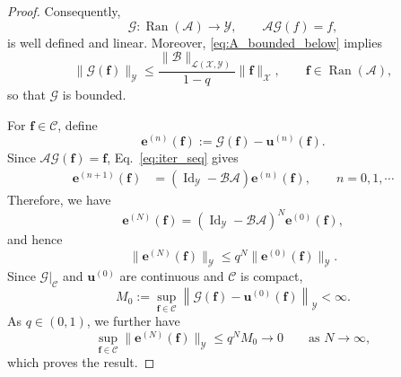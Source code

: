 \documentclass[preprint,numbers,sort&compress]{elsarticle}
\begin{document}
\begin{proof}
				Consequently,
				\[
				\mathcal G: \operatorname{Ran}(\mathcal A)\to\mathcal Y,
				\qquad
				\mathcal A\mathcal G(f)=f,
				\]
				is well defined and linear. Moreover, \eqref{eq:A_bounded_below} implies
				\[
				\|\mathcal G(\boldsymbol f)\|_{\mathcal Y}
				\leq
				\frac{\|\mathcal B\|_{\mathcal L(\mathcal X,\mathcal Y)}}{1-q}
				\|\boldsymbol f\|_{\mathcal X},
				\qquad
				\boldsymbol f\in\operatorname{Ran}(\mathcal A),
				\]
				so that $\mathcal G$ is bounded.
				
				For $\boldsymbol f\in\mathcal C$, define
				\[
				\boldsymbol e^{(n)}(\boldsymbol f)
				:=
				\mathcal G(\boldsymbol f)
				-
				\boldsymbol u^{(n)}(\boldsymbol f).
				\]
				Since
				$\mathcal A\mathcal G(\boldsymbol f)=\boldsymbol f$,
				Eq.~\eqref{eq:iter_seq} gives
				\[
				\begin{aligned}
					\boldsymbol e^{(n+1)}(\boldsymbol f)
					&=
					\left(
					\operatorname{Id}_{\mathcal Y}
					-
					\mathcal B\mathcal A
					\right)
					\boldsymbol e^{(n)}(\boldsymbol f), \qquad n=0, 1, \cdots
				\end{aligned}
				\]
				Therefore, we have
				\[
				\boldsymbol e^{(N)}(\boldsymbol f)
				=
				\left(
				\operatorname{Id}_{\mathcal Y}
				-
				\mathcal B\mathcal A
				\right)^N
				\boldsymbol e^{(0)}(\boldsymbol f),
				\]
				and hence
				\[
				\|\boldsymbol e^{(N)}(\boldsymbol f)\|_{\mathcal Y}
				\leq
				q^N
				\|\boldsymbol e^{(0)}(\boldsymbol f)\|_{\mathcal Y}.
				\]
				Since $\mathcal G|_{\mathcal C}$ and $\boldsymbol u^{(0)}$ are continuous
				and $\mathcal C$ is compact,
				\[
				M_0
				:=
				\sup_{\boldsymbol f\in\mathcal C}
				\left\|
				\mathcal G(\boldsymbol f)
				-
				\boldsymbol u^{(0)}(\boldsymbol f)
				\right\|_{\mathcal Y}
				<\infty.
				\]
				As $q \in (0, 1)$, we further have
				\[
				\sup_{\boldsymbol f\in\mathcal C}
				\|\boldsymbol e^{(N)}(\boldsymbol f)\|_{\mathcal Y}
				\leq
				q^N M_0
				\longrightarrow 0
				\qquad
				\text{as }N\to\infty,
				\]
				which proves the result.
			\end{proof}
			
\end{document}
